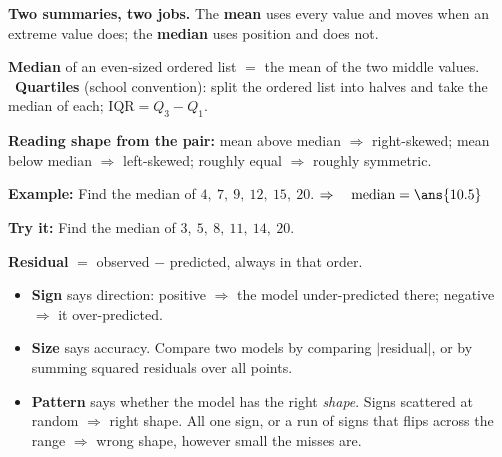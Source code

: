 \documentclass[12pt]{article}
\begin{document}


\begin{formulabox}
\textbf{Two summaries, two jobs.} The \textbf{mean} uses every value and moves when an
extreme value does; the \textbf{median} uses position and does not.\par
\smallskip
\textbf{Median} of an even-sized ordered list $=$ the mean of the two middle values.
\ \textbf{Quartiles} (school convention): split the ordered list into halves and take the
median of each; $\text{IQR} = Q_3 - Q_1$.\par
\smallskip
\textbf{Reading shape from the pair:} mean above median $\Rightarrow$ right-skewed; mean
below median $\Rightarrow$ left-skewed; roughly equal $\Rightarrow$ roughly symmetric.
\end{formulabox}

\begin{examplebox}
\textbf{Example:} \quad Find the median of $4,\ 7,\ 9,\ 12,\ 15,\ 20$.
$\Rightarrow\quad \text{median} = \ans{10.5}$
\end{examplebox}

\begin{tryitbox}
\textbf{Try it:} \quad Find the median of $3,\ 5,\ 8,\ 11,\ 14,\ 20$.\\[2pt]
\end{tryitbox}


\begin{formulabox}
\textbf{Residual} $=$ observed $-$ predicted, always in that order.\par
\smallskip
\begin{itemize}[label={$\bullet$}, leftmargin=1.1cm, itemsep=1pt, topsep=2pt]
  \item \textbf{Sign} says direction: positive $\Rightarrow$ the model under-predicted
        there; negative $\Rightarrow$ it over-predicted.
  \item \textbf{Size} says accuracy. Compare two models by comparing $|$residual$|$, or by
        summing squared residuals over all points.
  \item \textbf{Pattern} says whether the model has the right \emph{shape}. Signs scattered
        at random $\Rightarrow$ right shape. All one sign, or a run of signs that flips
        across the range $\Rightarrow$ wrong shape, however small the misses are.
\end{itemize}
\end{formulabox}
\end{document}
